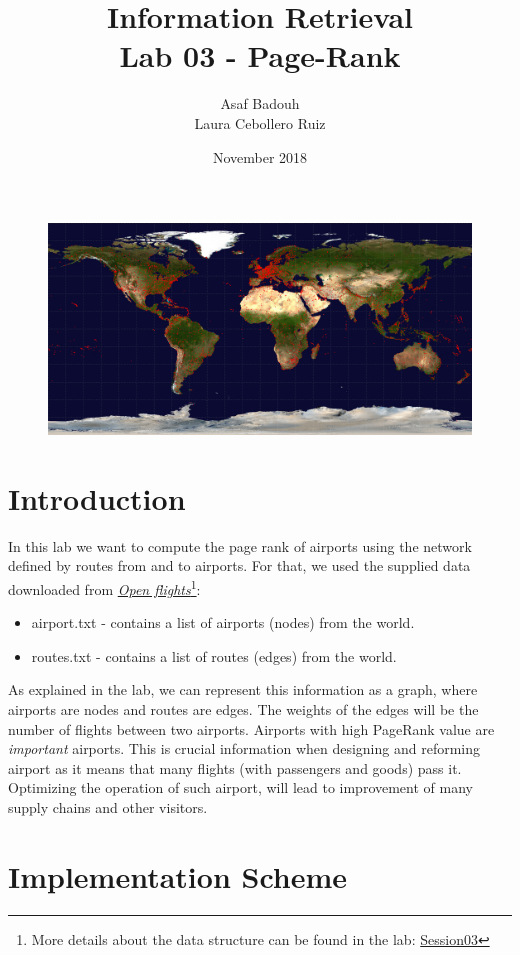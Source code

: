 \documentclass{article}
\title{Information Retrieval\\Lab 03 - Page-Rank}
\author{Asaf Badouh \\Laura Cebollero Ruiz }
\date{November 2018}
\begin{document}
\maketitle
\begin{figure}[b!]
    \centering
    \includegraphics[width=\linewidth]{openflights-apdb-2048.png}
\end{figure}
\newpage
\section{Introduction}
In this lab we want to compute the page rank of airports using the network defined by routes from and to airports. For that, we used the supplied data downloaded from  \href{https://openflights.org/data.html}{\textit{Open flights}}\footnote{More details about the data structure can be found in the lab:  \href{http://www.cs.upc.edu/~ir-miri/labs/session3.zip}{Session03}}:
\begin{itemize}
    \itemsep-0.5em 
    \item {\selectfont airport.txt} - contains a list of airports (nodes) from the world.
    \item {\selectfont routes.txt} - contains a list of routes (edges) from the world.
\end{itemize}
As explained in the lab, we can represent this information as a graph, where airports are nodes and routes are edges. The weights of the edges will be the number of flights between two airports. Airports with high PageRank value are \textit{important} airports. This is crucial information when designing and reforming airport as it means that many flights (with passengers and goods) pass it. Optimizing the operation of such airport, will lead to improvement of many supply chains and other visitors.

\section{Implementation Scheme}
\end{document}

